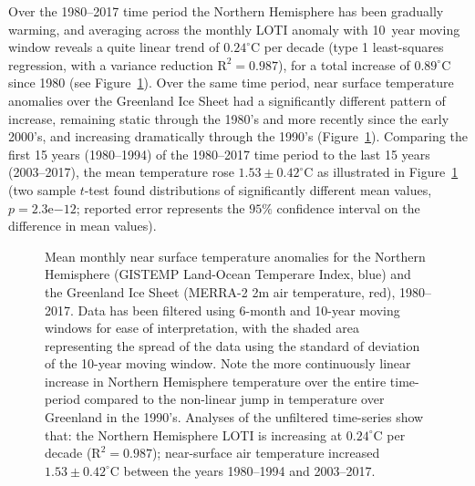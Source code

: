\documentclass[11pt]{report}
\begin{document}
 Over the 1980--2017 time period the Northern Hemisphere has been gradually warming, and averaging across the monthly LOTI anomaly with 10~year moving window reveals a quite linear trend of $0.24^{\circ}$C per decade (type 1 least-squares regression, with a variance reduction $\mathrm{R^2}=0.987$), for a total increase of $0.89^{\circ}$C since 1980 (see Figure~\ref{fig:climatewarming}). Over the same time period, near surface temperature anomalies over the Greenland Ice Sheet had a significantly different pattern of increase, remaining static through the 1980's and more recently since the early 2000's, and increasing dramatically through the 1990's (Figure~\ref{fig:climatewarming}). Comparing the first 15 years (1980--1994) of the 1980--2017 time period to the last 15 years (2003--2017), the mean temperature rose $1.53\pm0.42^{\circ}$C as illustrated in Figure~\ref{fig:climatewarming} (two sample $t$-test found distributions of significantly different mean values, $p = 2.3\mathrm{e}{-12}$; reported error represents the $95\%$ confidence interval on the difference in mean values). 
 
 \begin{figure}[h]
\centering
{}
\caption[Near surface warming of the Northern Hemisphere and Greenland Ice Sheet]{Mean monthly near surface temperature anomalies for the Northern Hemisphere (GISTEMP Land-Ocean Temperare Index, blue) and the Greenland Ice Sheet (MERRA-2 2m air temperature, red), 1980--2017. Data has been filtered using 6-month and 10-year moving windows for ease of interpretation, with the shaded area representing the spread of the data using the standard of deviation of the 10-year moving window. Note the more continuously linear increase in Northern Hemisphere temperature over the entire time-period compared to the non-linear jump in temperature over Greenland in the 1990's. Analyses of the unfiltered time-series show that: the Northern Hemisphere LOTI is increasing at $0.24^{\circ}$C per decade ($\mathrm{R^2}=0.987$); near-surface air temperature increased $1.53\pm0.42^{\circ}$C between the years 1980--1994 and 2003--2017.} \label{fig:climatewarming}
\end{figure}
\end{document}
